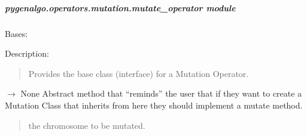 \documentclass[letterpaper,10pt,english]{sphinxmanual}
\begin{document}
\subparagraph{pygenalgo.operators.mutation.mutate\_operator module}
\label{\detokenize{pygenalgo.operators.mutation:module-pygenalgo.operators.mutation.mutate_operator}}\label{\detokenize{pygenalgo.operators.mutation:pygenalgo-operators-mutation-mutate-operator-module}}

\begin{fulllineitems}
\label{\detokenize{pygenalgo.operators.mutation:pygenalgo.operators.mutation.mutate_operator.MutationOperator}}
\pysigstartsignatures
\pysiglinewithargsret
{}
{}
{}
\pysigstopsignatures
\sphinxAtStartPar
Bases: {\hyperref[\detokenize{pygenalgo.operators:pygenalgo.operators.genetic_operator.GeneticOperator}]{}}

\sphinxAtStartPar
Description:
\begin{quote}

\sphinxAtStartPar
Provides the base class (interface) for a Mutation Operator.
\end{quote}

\begin{fulllineitems}
\label{\detokenize{pygenalgo.operators.mutation:pygenalgo.operators.mutation.mutate_operator.MutationOperator.mutate}}
\pysigstartsignatures
\pysiglinewithargsret
{}
{}
{{ $\rightarrow$ None}}
\pysigstopsignatures
\sphinxAtStartPar
Abstract method that “reminds” the user that if they want to
create a Mutation Class that inherits from here they should
implement a mutate method.
\begin{quote}\begin{description}
\sphinxAtStartPar
{} \textendash{} the chromosome to be mutated.


\end{description}
\end{quote}
\end{fulllineitems}
\end{fulllineitems}
\end{document}
